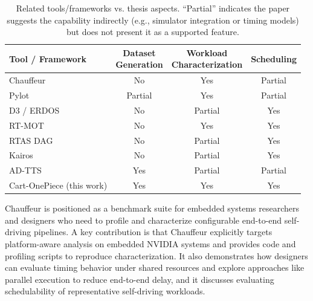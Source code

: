 
\begin{table}[t]
\centering
\footnotesize
\setlength{\tabcolsep}{3pt}
\renewcommand{\arraystretch}{1.15}
\caption{Related tools/frameworks vs. thesis aspects. ``Partial'' indicates the paper suggests the capability indirectly (e.g., simulator integration or timing models) but does not present it as a supported feature.}
\label{tab:rw_aspects}
\begin{tabularx}{\linewidth}{@{}>{\raggedright\arraybackslash}Xccc@{}}
\hline
\textbf{Tool / Framework} & \shortstack[c]{\textbf{Dataset}\\\textbf{Generation}} & \shortstack[c]{\textbf{Workload}\\\textbf{Characterization}} & \textbf{Scheduling} \\
\hline
Chauffeur~\cite{Maity2021Chauffeur:Systems} & No & Yes & Partial \\
Pylot~\cite{Gog2021Pylot:Vehicles} & Partial & Yes & Partial \\
D3 / ERDOS~\cite{Gog2022} & No & Partial & Yes \\
RT-MOT~\cite{Kang2022RTMOT:RTSS} & No & Yes & Yes \\
RTAS DAG ~\cite{Sun2023} & No & Partial & Yes \\
Kairos~\cite{kairos} & No & Partial & Yes \\
AD-TTS~\cite{Li2025ADTTS} & Yes & Partial & Partial \\
Cart-OnePiece (this work) & Yes & Yes & Yes \\
\hline
\end{tabularx}
\end{table}

Chauffeur \cite{Maity2021Chauffeur:Systems} is positioned as a benchmark suite for embedded systems researchers and designers who need to profile and characterize configurable end-to-end self-driving pipelines. A key contribution is that Chauffeur explicitly targets platform-aware analysis on embedded NVIDIA systems and provides code and profiling scripts to reproduce characterization. It also demonstrates how designers can evaluate timing behavior under shared resources and explore approaches like parallel execution to reduce end-to-end delay, and it discusses evaluating schedulability of representative self-driving workloads. 

